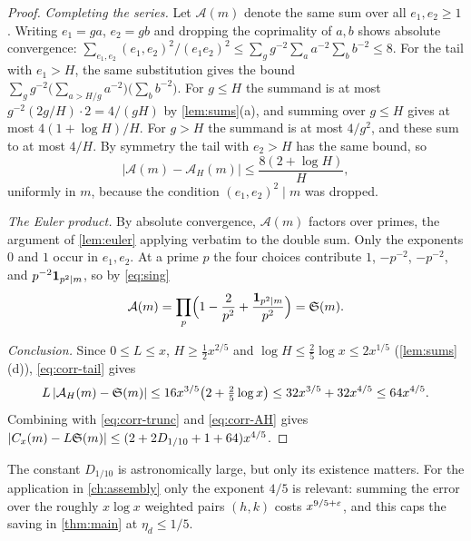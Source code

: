 \begin{proof}
\emph{Completing the series.} Let $\mathcal A(m)$ denote the same sum over all $e_1,e_2\ge1$. Writing $e_1=ga$, $e_2=gb$ and dropping the coprimality of $a,b$ shows absolute convergence:
$\sum_{e_1,e_2}(e_1,e_2)^2/(e_1e_2)^2\le\sum_gg^{-2}\sum_aa^{-2}\sum_bb^{-2}\le8$. For the tail with $e_1>H$, the same substitution gives the bound $\sum_gg^{-2}\bigl(\sum_{a>H/g}a^{-2}\bigr)\bigl(\sum_bb^{-2}\bigr)$. For $g\le H$ the summand is at most $g^{-2}(2g/H)\cdot2=4/(gH)$ by \cref{lem:sums}(a), and summing over $g\le H$ gives at most $4(1+\log H)/H$. For $g>H$ the summand is at most $4/g^2$, and these sum to at most $4/H$. By symmetry the tail with $e_2>H$ has the same bound, so
\begin{equation}\label{eq:corr-tail}
|\mathcal A(m)-\mathcal A_H(m)|\le\frac{8(2+\log H)}H,
\end{equation}
uniformly in $m$, because the condition $(e_1,e_2)^2\mid m$ was dropped.

\emph{The Euler product.} By absolute convergence, $\mathcal A(m)$ factors over primes, the argument of \cref{lem:euler} applying verbatim to the double sum. Only the exponents $0$ and $1$ occur in $e_1,e_2$. At a prime $p$ the four choices contribute $1$, $-p^{-2}$, $-p^{-2}$, and $p^{-2}\mathbf 1_{p^2\mid m}$, so by \eqref{eq:sing}
\[
\mathcal A(m)=\prod_p\Bigl(1-\frac2{p^2}+\frac{\mathbf 1_{p^2\mid m}}{p^2}\Bigr)=\mathfrak S(m).
\]

\emph{Conclusion.} Since $0\le L\le x$, $H\ge\frac12x^{2/5}$ and $\log H\le\frac25\log x\le2x^{1/5}$ (\cref{lem:sums}(d)), \eqref{eq:corr-tail} gives
\[
L\,|\mathcal A_H(m)-\mathfrak S(m)|\le16x^{3/5}\bigl(2+\tfrac25\log x\bigr)\le32x^{3/5}+32x^{4/5}\le64x^{4/5}.
\]
Combining with \eqref{eq:corr-trunc} and \eqref{eq:corr-AH} gives $|C_x(m)-L\mathfrak S(m)|\le(2+2D_{1/10}+1+64)x^{4/5}$.
\end{proof}

\begin{remark}
The constant $D_{1/10}$ is astronomically large, but only its existence matters. For the application in \cref{ch:assembly} only the exponent $4/5$ is relevant: summing the error over the roughly $x\log x$ weighted pairs $(h,k)$ costs $x^{9/5+\varepsilon}$, and this caps the saving in \cref{thm:main} at $\eta_d\le1/5$.
\end{remark}
